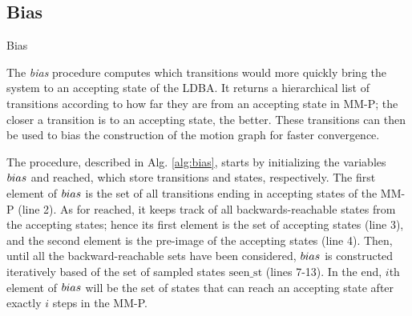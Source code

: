 \subsection{Bias}
\label{sec:bias}

\begin{algorithm}[t]
    \small
    \DontPrintSemicolon
    \caption{Bias}
    \label{alg:bias}
\end{algorithm}




The \emph{bias} procedure computes which transitions would more quickly bring the system to an accepting state of the LDBA. It returns a hierarchical list of transitions according to how far they are from an accepting state in MM-P; the closer a transition is to an accepting state, the better. These transitions can then be used to bias the construction of the motion graph for faster convergence.

The procedure, described in Alg. \ref{alg:bias}, starts by initializing the variables $bias$ and $\mathrm{reached}$, which store transitions and states, respectively. The first element of $bias$ is the set of all transitions ending in accepting states of the MM-P (line 2). As for $\mathrm{reached}$, it keeps track of all backwards-reachable states from the accepting states; hence its first element is the set of accepting states (line 3), and the second element is the pre-image of the accepting states (line 4).
Then, until all the backward-reachable sets have been considered, $bias$ is constructed iteratively based of the set of sampled states $\mathrm{seen\_st}$ (lines 7-13). In the end, $i$th element of $bias$ will be the set of states that can reach an accepting state after exactly $i$ steps in the MM-P. 

